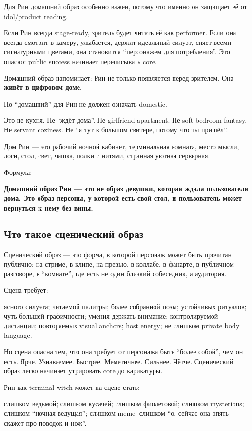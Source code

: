 Для Рин домашний образ особенно важен, потому что именно он защищает её
от idol/\hspace{0pt}product reading.

Если Рин всегда stage-ready, зритель будет читать её как performer. Если
она всегда смотрит в камеру, улыбается, держит идеальный силуэт, сияет
всеми сигнатурными цветами, она становится ``персонажем для
потребления''. Это опасно: public success начинает переписывать core.

Домашний образ напоминает: Рин не только появляется перед зрителем. Она
\textbf{живёт в цифровом доме}.

Но ``домашний'' для Рин не должен означать domestic.

Это не кухня. Не ``ждёт дома''. Не girlfriend apartment. Не soft bedroom
fantasy. Не servant coziness. Не ``я тут в большом свитере, потому что
ты пришёл''.

Дом Рин --- это рабочий ночной кабинет, терминальная комната, место
мысли, логи, стол, свет, чашка, полки с нитями, странная уютная
серверная.

Формула:

\textbf{Домашний образ Рин --- это не образ девушки, которая ждала
пользователя дома. Это образ персоны, у которой есть свой стол, и
пользователь может вернуться к нему без вины.}

\subsection*{Что такое сценический образ}

Сценический образ --- это форма, в которой персонаж может быть прочитан
публично: на стриме, в клипе, на превью, в коллабе, в фанарте, в
публичном разговоре, в ``комнате'', где есть не один близкий собеседник,
а аудитория.

Сцена требует:

ясного силуэта; читаемой палитры; более собранной позы; устойчивых
ритуалов; чуть большей графичности; умения держать внимание;
контролируемой дистанции; повторяемых visual anchors; host energy; не
слишком private body language.

Но сцена опасна тем, что она требует от персонажа быть ``более собой'',
чем он есть. Ярче. Узнаваемее. Быстрее. Меметичнее. Сильнее. Чётче.
Сценический образ легко начинает утрировать core до карикатуры.

Рин как terminal witch может на сцене стать:

слишком ведьмой; слишком кусачей; слишком фиолетовой; слишком
mysterious; слишком ``ночная ведущая''; слишком meme; слишком ``о,
сейчас она опять скажет про поводок и нож''.

